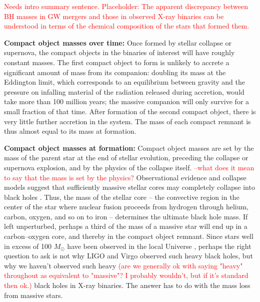 \documentclass[iop,onecolumn]{revtex4}
\begin{document}
\textcolor{red}{Needs intro summary sentence. Placeholder: The apparent discrepancy between BH masses in GW mergers and those in observed X-ray binaries can be understood in terms of the chemical composition of the stars that formed them.}

\textbf{Compact object masses over time:} Once formed by stellar collapse or supernova, the compact objects in the binaries of interest will have roughly constant masses. The first compact object to form is unlikely to accrete a significant amount of mass from its companion: doubling its mass at the Eddington limit, which corresponds to an equilibrium between gravity and the pressure on infalling material of the radiation released during accretion, would take more than 100 million years; the massive companion will only survive for a small fraction of that time. After formation of the second compact object, there is very little further accretion in the system. The mass of each compact remnant is thus almost equal to its mass at formation. 

\textbf{Compact object masses at formation:} Compact object masses are set by the mass of the parent star at the end of stellar evolution, preceding the collapse or supernova explosion, and by the physics of the collapse itself. \textcolor{red}{--what does it mean to say that the mass is set by the physics?} Observational evidence and collapse models suggest that sufficiently massive stellar cores may completely collapse into black holes \citep[for a review, see][]{Mirabel:2016}.  Thus, the mass of the stellar core -- the convective region in the center of the star where nuclear fusion proceeds from hydrogen through helium, carbon, oxygen, and so on to iron -- determines the ultimate black hole mass.  If left unperturbed, perhaps a third of the mass of a massive star will end up in a carbon--oxygen core, and thereby in the compact object remnant.  Since stars well in excess of 100 $M_\odot$ have been observed in the local Universe \citep[e.g.,][]{Schneider:2018}, perhaps the right question to ask is not why LIGO and Virgo observed such heavy black holes, but why we haven't observed such heavy \textcolor{red}{(are we generally ok with saying "heavy" throughout as equivalent to "massive"? I probably wouldn't, but if it's standard then ok.)} black holes in X-ray binaries. The answer has to do with the mass loss from massive stars. 
\end{document}
